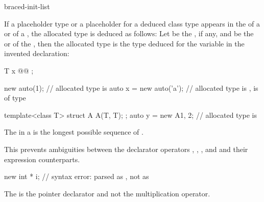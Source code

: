\begin{bnf}
\br
    \terminal{(}  \terminal{)}\br
    braced-init-list
\end{bnf}

\pnum
If a placeholder type or
a placeholder for a deduced class type
appears in the
 of a  or
 of a ,
the allocated type is deduced as follows:
Let
 be the , if any,
and
 be the  or  of
the , then the allocated type is the type
deduced for the variable  in the invented
declaration:

\begin{codeblock}
T x @\textrm{}@ ;
\end{codeblock}

\begin{example}
\begin{codeblock}
new auto(1);                    // allocated type is 
auto x = new auto('a');         // allocated type is ,  is of type 

template<class T> struct A { A(T, T); };
auto y = new A{1, 2};           // allocated type is 
\end{codeblock}
\end{example}

\pnum
The  in a  is the longest
possible sequence of .
\begin{note}
This prevents ambiguities between the declarator operators \tcode{\&}, \tcode{\&\&},
\tcode{*}, and \tcode{[]} and their expression counterparts.
\end{note}
\begin{example}
\begin{codeblock}
new int * i;                    // syntax error: parsed as , not as 
\end{codeblock}
The \tcode{*} is the pointer declarator and not the multiplication
operator.
\end{example}

